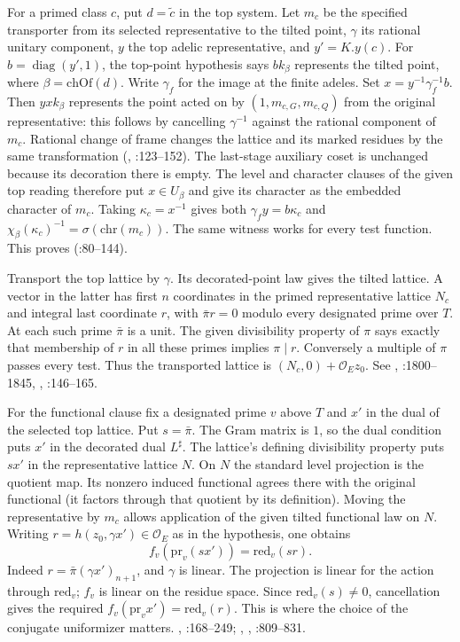 For a primed class $c$, put $d=\tilde c$ in the top system. Let $m_c$
be the specified transporter from its selected representative to the
tilted point, $\gamma$ its rational unitary component, $y$ the top
adelic representative, and $y'=K.y(c)$. For $b=\operatorname{diag}(y',1)$,
the top-point hypothesis says $bk_\beta$ represents the tilted point,
where $\beta=\mathrm{chOf}(d)$. Write $\gamma_f$ for the image at the
finite adeles. Set $x=y^{-1}\gamma_f^{-1}b$. Then $yxk_\beta$
represents the point acted on by $(1,m_{c,G},m_{c,Q})$ from the
original representative: this follows by cancelling $\gamma^{-1}$
against the rational component of $m_c$. Rational change of frame
changes the lattice and its marked residues by the same transformation
(, :123--152).
The last-stage auxiliary coset is unchanged because its decoration
there is empty. The level and character clauses of the given top
reading therefore put $x\in U_\beta$ and give its character as the
embedded character of $m_c$. Taking $\kappa_c=x^{-1}$ gives both
$\gamma_f y=b\kappa_c$ and
$\chi_\beta(\kappa_c)^{-1}=\sigma(\mathrm{chr}(m_c))$.
The same witness works for every test function. This proves
 (:80--144).

Transport the top lattice by $\gamma$. Its decorated-point law gives
the tilted lattice. A vector in the latter has first $n$ coordinates
in the primed representative lattice $N_c$ and integral last
coordinate $r$, with $\bar\pi r=0$ modulo every designated prime over
$T$. At each such prime $\bar\pi$ is a unit. The given divisibility
property of $\pi$ says exactly that membership of $r$ in all these primes
implies $\pi\mid r$. Conversely a multiple of $\pi$ passes every test.
Thus the transported lattice is $(N_c,0)+\mathcal O_E z_0$.
See , :1800--1845,
, :146--165.

For the functional clause fix a designated prime $v$ above $T$ and
$x'$ in the dual of the selected top lattice. Put $s=\bar\pi$.
The Gram matrix is $1$, so the dual condition puts $x'$ in the
decorated dual $L^{\sharp}$. The lattice's defining divisibility
property puts $sx'$ in the representative lattice $N$. On $N$ the
standard level projection is the quotient map. Its nonzero induced
functional agrees there with the original functional (it factors
through that quotient by its definition). Moving the representative
by $m_c$ allows application of the given tilted functional law on $N$.
Writing $r=h(z_0,\gamma x')\in\mathcal O_E$ as in the hypothesis,
one obtains
\[
 f_v(\mathrm{pr}_v(sx'))=\mathrm{red}_v(sr).
\]
Indeed $r=\bar\pi(\gamma x')_{n+1}$, and $\gamma$ is linear.
The projection is linear for the action through $\mathrm{red}_v$;
$f_v$ is linear on the residue space. Since
$\mathrm{red}_v(s)\ne0$, cancellation gives the required
$f_v(\mathrm{pr}_v x')=\mathrm{red}_v(r)$. This is where the
choice of the conjugate uniformizer matters.
, :168--249;
, ,
:809--831.

